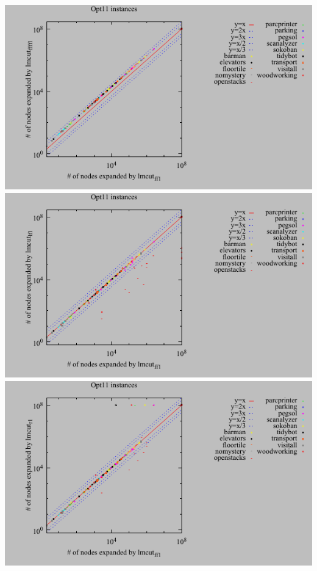 \includegraphics{tables/opt11-expanded-lmcut_ff-lmcut_ffff.pdf}
\linebreak
\includegraphics{tables/opt11-expanded-lmcut_ff-lmcut_lf.pdf}
\linebreak
\includegraphics{tables/opt11-expanded-lmcut_ff-lmcut_r.pdf}
\linebreak
